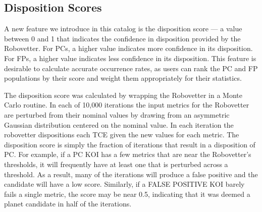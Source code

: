 



\subsection{Disposition Scores}

A new feature we introduce in this catalog is the disposition score --- a value between 0 and 1 that indicates the confidence in disposition provided by the Robovetter. For PCs, a higher value indicates more confidence in its disposition. For FPs, a higher value indicates less confidence in its disposition. This feature is desirable to calculate accurate occurrence rates, as users can rank the PC and FP populations by their score and weight them appropriately for their statistics.

The disposition score was calculated by wrapping the Robovetter in a Monte Carlo routine. In each of 10,000 iterations the input metrics for the Robovetter are perturbed from their nominal values by drawing from an asymmetric Gaussian distribution centered on the nominal value. In each iteration the robovetter dispositions each TCE given the new values for each metric. The disposition score is simply the fraction of iterations that result in a disposition of PC. For example, if a PC KOI has a few metrics that are near the Robovetter's thresholds, it will frequently have at least one that is perturbed across a threshold. As a result, many of the iterations will produce a false positive and the candidate will have a low score.  Similarly, if a FALSE POSITIVE KOI barely fails a single metric, the score may be near 0.5, indicating that it was deemed a planet candidate in half of the iterations.

